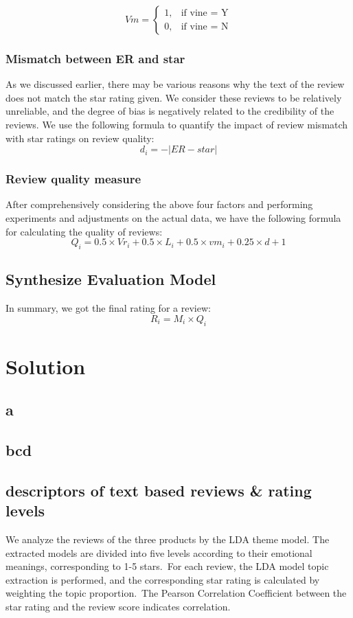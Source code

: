 \documentclass{mcmthesis}
\begin{document}
\[
Vm = 
\begin{cases}  
	1, &\text{if vine = Y} \\
	0, &\text{if vine = N}
\end{cases}
\]

\subsubsection{ Mismatch between ER and star}
As we discussed earlier, there may be various reasons why the text of the review does not match the star rating given. We consider these reviews to be relatively unreliable, and the degree of bias is negatively related to the credibility of the reviews. We use the following formula to quantify the impact of review mismatch with star ratings on review quality:
\[
	d_{i}  = -|ER - star|
\]

\subsubsection{Review quality measure}
After comprehensively considering the above four factors and performing experiments and adjustments on the actual data, we have the following formula for calculating the quality of reviews:
\[
Q_i = 0.5 \times Vr_i + 0.5 \times L_i + 0.5 \times vm_i + 0.25 \times d + 1
\]

\subsection{Synthesize Evaluation Model}
In summary, we got the final rating for a review:
\[
 R_i = M_i \times Q_i
\]

\section{ Solution }

\subsection{a}
\subsection{bcd}
\subsection{descriptors of text based reviews \& rating levels}
We analyze the reviews of the three products by the LDA theme model. The extracted models are divided into five levels according to their emotional meanings, corresponding to 1-5 stars. For each review, the LDA model topic extraction is performed, and the corresponding star rating is calculated by weighting the topic proportion. The Pearson Correlation Coefficient between the star rating and the review score indicates correlation.
\end{document}
